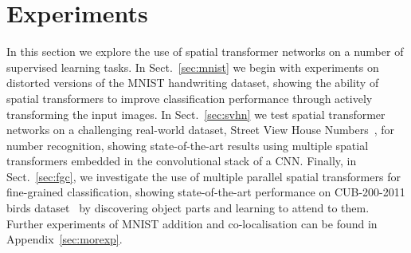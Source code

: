 \documentclass{article} %
\newcommand{\sref}[1]{Sect.~\ref{#1}}
\begin{document}
\section{Experiments}\label{sec:experiments}
In this section we explore the use of spatial transformer networks on a number
of supervised learning tasks. In \sref{sec:mnist} we begin with experiments on
distorted versions of the MNIST handwriting dataset, showing the
ability of spatial transformers to improve classification performance through
actively transforming the input images. In \sref{sec:svhn} we test spatial
transformer networks on a challenging real-world dataset, Street View House
Numbers~\cite{Netzer11}, for number recognition, showing state-of-the-art
results using multiple spatial transformers embedded in the convolutional stack
of a CNN. Finally, in \sref{sec:fgc}, we investigate the use of multiple
parallel spatial transformers for fine-grained classification, showing
state-of-the-art performance on CUB-200-2011 birds dataset~\cite{Wah11} by discovering object parts and learning to attend to them. Further experiments of MNIST addition and co-localisation can be found in Appendix~\ref{sec:morexp}.
\end{document}

